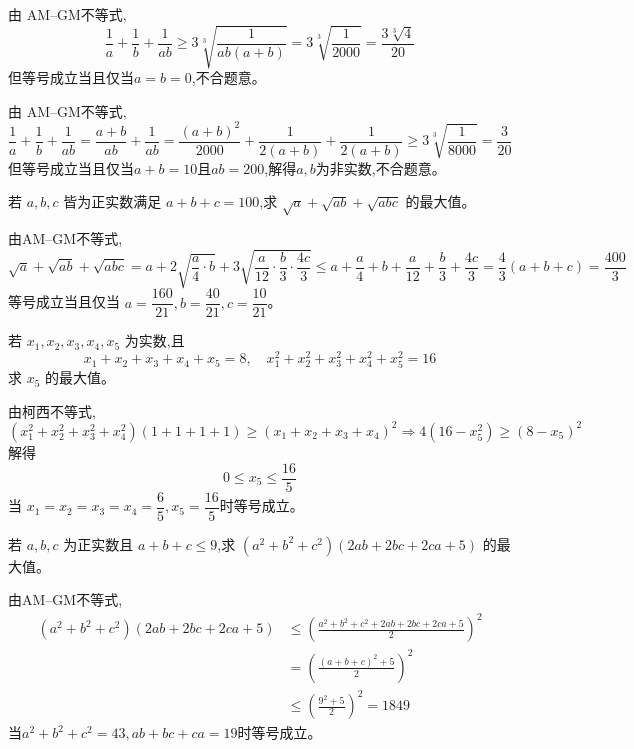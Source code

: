 \begin{questions}
\begin{solution}
        由 AM–GM不等式,
        \[
        \frac{1}{a} + \frac{1}{b} + \frac{1}{ab} \ge 3 \sqrt[3]{\frac{1}{ab(a+b)}}= 3 \sqrt[3]{\frac{1}{2000}}=\frac{3\sqrt[3]{4}}{20}
        \]
        但等号成立当且仅当$a=b=0$,不合题意。

        由 AM–GM不等式,
        \[
        \frac{1}{a} + \frac{1}{b} + \frac{1}{ab} = \frac{a+b}{ab} +\frac{1}{ab} = \frac{(a+b)^2}{2000}+\frac{1}{2(a+b)}+\frac{1}{2(a+b)}
        \ge 3\sqrt[3]{\frac{1}{8000}} =\frac{3}{20}
        \]
        但等号成立当且仅当$a+b=10$且$ab=200$,解得$a,b$为非实数,不合题意。
    \end{solution}

    \question 若 $a, b, c$ 皆为正实数满足 $a+b+c=100$,求 $\sqrt{a} + \sqrt{ab} + \sqrt{abc}$ 的最大值。
    \begin{solution}
        由AM–GM不等式,
        \[
        \sqrt{a} + \sqrt{ab} + \sqrt{abc} = a + 2\sqrt{\frac{a}{4}\cdot b} + 3\sqrt{\frac{a}{12}\cdot \frac{b}{3} \cdot \frac{4c}{3}} \le a+\frac{a}{4}+b+\frac{a}{12}+\frac{b}{3} + \frac{4c}{3} = \frac{4}{3}(a+b+c) =\frac{400}{3}
        \]  
        等号成立当且仅当 $a = \dfrac{160}{21}, b = \dfrac{40}{21}, c = \dfrac{10}{21}$。
    \end{solution}

    \question 若 $x_1, x_2, x_3, x_4, x_5$ 为实数,且
    \[
    x_1+x_2+x_3+x_4+x_5=8, \quad x_1^2+x_2^2+x_3^2+x_4^2+x_5^2=16
    \]  
    求 $x_5$ 的最大值。
    \begin{solution}
        由柯西不等式,
        \[
        (x_1^2+x_2^2+x_3^2+x_4^2)(1+1+1+1) \ge (x_1+x_2+x_3+x_4)^2 \Rightarrow 4(16-x_5^2) \ge (8-x_5)^2
        \]  
        解得 
        \[
        0 \le x_5 \le \frac{16}{5}
        \]  
        当 $x_1=x_2=x_3=x_4=\dfrac{6}{5},x_5 = \dfrac{16}{5}$时等号成立。
    \end{solution}

    \question 若 $a,b,c$ 为正实数且 $a+b+c \le 9$,求 $(a^2+b^2+c^2)(2ab+2bc+2ca+5)$ 的最大值。
    \begin{solution}
        由AM–GM不等式,
        \begin{align*}
        (a^2+b^2+c^2)(2ab+2bc+2ca+5) 
        &\le \left(\frac{a^2+b^2+c^2 + 2ab+2bc+2ca+5}{2}\right)^2 \\
        &= \left(\frac{(a+b+c)^2+5}{2}\right)^2 \\
        &\le \left(\frac{9^2+5}{2}\right)^2 = 1849
        \end{align*}
        当$a^2+b^2+c^2=43,ab+bc+ca=19$时等号成立。
    \end{solution}


\end{questions}

